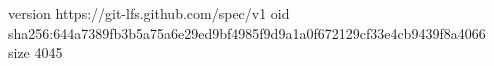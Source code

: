 version https://git-lfs.github.com/spec/v1
oid sha256:644a7389fb3b5a75a6e29ed9bf4985f9d9a1a0f672129cf33e4cb9439f8a4066
size 4045
